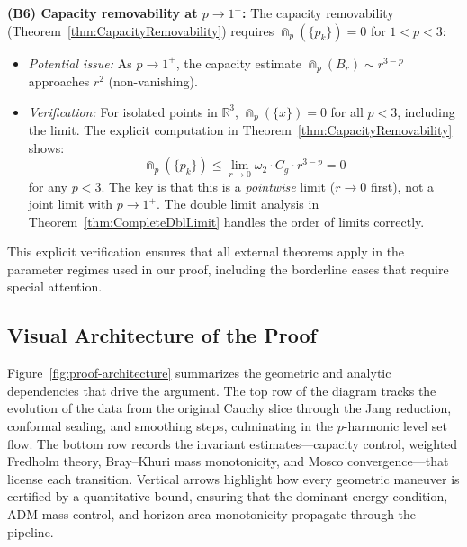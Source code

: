 \begin{remark}
\textbf{(B6) Capacity removability at $p \to 1^+$:}
The capacity removability (Theorem~\ref{thm:CapacityRemovability}) requires $\Cap_p(\{p_k\}) = 0$ for $1 < p < 3$:
\begin{itemize}
    \item \textit{Potential issue:} As $p \to 1^+$, the capacity estimate $\Cap_p(B_r) \sim r^{3-p}$ approaches $r^2$ (non-vanishing).
    \item \textit{Verification:} For isolated points in $\mathbb{R}^3$, $\Cap_p(\{x\}) = 0$ for all $p < 3$, including the limit. The explicit computation in Theorem~\ref{thm:CapacityRemovability} shows:
    \[
    \Cap_p(\{p_k\}) \le \lim_{r \to 0} \omega_2 \cdot C_g \cdot r^{3-p} = 0
    \]
    for any $p < 3$. The key is that this is a \emph{pointwise} limit ($r \to 0$ first), not a joint limit with $p \to 1^+$. The double limit analysis in Theorem~\ref{thm:CompleteDblLimit} handles the order of limits correctly.
\end{itemize}

This explicit verification ensures that all external theorems apply in the parameter regimes used in our proof, including the borderline cases that require special attention.
\end{remark}

\subsection{Visual Architecture of the Proof}
Figure~\ref{fig:proof-architecture} summarizes the geometric and analytic dependencies that drive the argument. The top row of the diagram tracks the evolution of the data from the original Cauchy slice through the Jang reduction, conformal sealing, and smoothing steps, culminating in the $p$-harmonic level set flow. The bottom row records the invariant estimates---capacity control, weighted Fredholm theory, Bray--Khuri mass monotonicity, and Mosco convergence---that license each transition. Vertical arrows highlight how every geometric maneuver is certified by a quantitative bound, ensuring that the dominant energy condition, ADM mass control, and horizon area monotonicity propagate through the pipeline.

